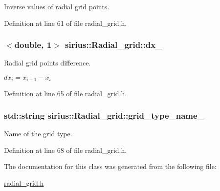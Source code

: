 Inverse values of radial grid points. 



Definition at line 61 of file radial\+\_\+grid.\+h.

\hypertarget{classsirius_1_1_radial__grid_a45e025061de272a37ffcc756fe4bec19}{}
\subsubsection[{dx\+\_\+}]{$<$double, 1$>$ sirius\+::\+Radial\+\_\+grid\+::dx\+\_\+\hspace{0.3cm}{\ttfamily [private]}}\label{classsirius_1_1_radial__grid_a45e025061de272a37ffcc756fe4bec19}


Radial grid points difference. 

$ dx_{i} = x_{i+1} - x_{i} $ 

Definition at line 65 of file radial\+\_\+grid.\+h.

\hypertarget{classsirius_1_1_radial__grid_a6a43795fd734611edaf54f02299c9784}{}
\subsubsection[{grid\+\_\+type\+\_\+name\+\_\+}]{\setlength{\rightskip}{0pt plus 5cm}std\+::string sirius\+::\+Radial\+\_\+grid\+::grid\+\_\+type\+\_\+name\+\_\+\hspace{0.3cm}{\ttfamily [private]}}\label{classsirius_1_1_radial__grid_a6a43795fd734611edaf54f02299c9784}


Name of the grid type. 



Definition at line 68 of file radial\+\_\+grid.\+h.



The documentation for this class was generated from the following file\+:\begin{DoxyCompactItemize}
\item 
\hyperlink{radial__grid_8h}{radial\+\_\+grid.\+h}\end{DoxyCompactItemize}

